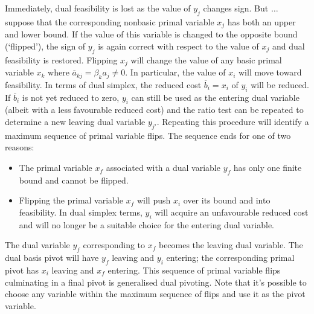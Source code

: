Immediately, dual feasibility is lost as the value of $y_j$ changes sign.
But $\ldots$ suppose that the corresponding nonbasic primal variable $x_j$
has both an upper and lower bound.
If the value of this variable is changed to the opposite bound (`flipped'),
the sign of $y_j$ is
again correct with respect to the value of $x_j$ and dual feasibility is
restored.
Flipping $x_j$ will change the value of any basic primal variable $x_k$
where $\overline{a}_{kj} = \beta_k a_j \neq 0$.
In particular, the value of $x_i$ will move toward feasibility.
In terms of dual simplex, the reduced cost $\overline{b}_i = x_i$ of $y_i$
will be reduced.
If $\overline{b}_i$ is not yet reduced to zero, $y_i$ can still be used as
the entering dual variable (albeit with a less favourable reduced cost) and
the ratio test can be repeated to determine
a new leaving dual variable $y_{j'}$.
Repeating this procedure will identify a maximum sequence of primal variable
flips.
The sequence ends for one of two reasons:
\begin{itemize}
  \item
  The primal variable $x_{f}$ associated with a dual variable $y_f$ has
  only one finite bound and cannot be flipped.

  \item
  Flipping the primal variable $x_f$ will push $x_i$ over its
  bound and into feasibility.
  In dual simplex terms, $y_i$ will acquire an unfavourable reduced cost
  and will no longer be a suitable choice for the entering dual variable.
\end{itemize}
The dual variable $y_f$ corresponding to
$x_f$ becomes the leaving dual variable.
The dual basis pivot will have $y_f$ leaving and $y_i$ entering; the
corresponding primal pivot has $x_i$ leaving and $x_f$ entering.
This sequence of primal variable flips culminating in a final pivot is
generalised dual pivoting.
Note that it's possible to choose any variable within the maximum sequence of
flips and use it as the pivot variable.


